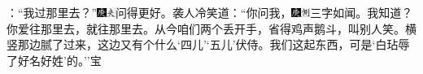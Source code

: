 {：``我过那里去？''{\includegraphics[width=3mm]{../Images/00004}\includegraphics[width=3mm]{../Images/00012}\footnotesize \kaishu 问得更好。}袭人冷笑道：``你问我，{\includegraphics[width=3mm]{../Images/00004}\includegraphics[width=3mm]{../Images/00011}\footnotesize \kaishu 三字如闻。}我知道？你爱往那里去，就往那里去。从今咱们两个丢开手，省得鸡声鹅斗，叫别人笑。横竖那边腻了过来，这边又有个什么`四儿'`五儿'伏侍。我们这起东西，可是`白玷辱了好名好姓'的。''宝}
